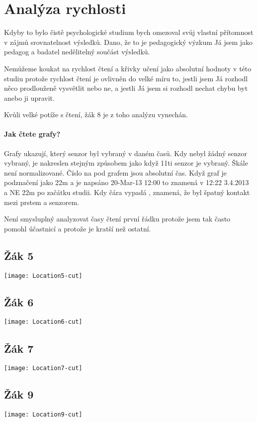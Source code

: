 \section{Analýza rychlosti}
Kdyby to bylo čistě psychologické studium bych omezoval svůj vlastní přítomnost v zájmů srovnatelnost výsledků.  Dano, že to je pedagogický výzkum Já jsem jako pedagog a badatel nedělitelný součást výsledků.

Nemůžeme koukat na rychlost čtení a křivky učení jako absolutní hodnoty v této studiu protože rychlost čtení je ovlivněn do velké míru to, jestli jsem Já rozhodl něco prodlouženě vysvětlit nebo ne, a jestli Já jsem si rozhodl nechat chybu byt anebo ji upravit.

Kvůli velké potíže s čtení, žák 8 je z toho analýzu vynechán.

\paragraph{Jak čtete grafy?}  Grafy ukazují, který senzor byl vybraný v daném časů.  Kdy nebyl žádný senzor vybraný, je nakreslen stejným způsobem jako když 11ti senzor je vybraný.  Škále není normalizované. Číslo na pod grafem jsou absolutní čas.  Když graf je podznačení jako 22m a je napsáno 20-Mar-13 12:00 to znamená v 12:22 3.4.2013 a NE 22m po začátku studii.  Kdy čára vypadá , znamená, že byl špatný kontakt mezi prstem a senzorem.

Není smysluplný analyzovat časy čtení první řádku protože jsem tak často pomohl účastnicí a protože je kratší než ostatní.


\subsection{Žák 5}
\texttt{[image: Location5-cut]}
\subsection{Žák 6}
\texttt{[image: Location6-cut]}
\subsection{Žák 7}
\texttt{[image: Location7-cut]}
\subsection{Žák 9}
\texttt{[image: Location9-cut]}

